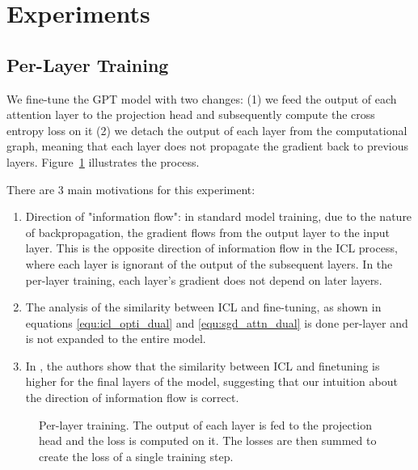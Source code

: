 \documentclass[11pt]{article}
\begin{document}
\section{Experiments}
\subsection{Per-Layer Training}
We fine-tune the GPT model with two changes: (1) we feed the output of each attention layer to the projection head and subsequently compute the cross entropy loss on it
(2) we detach the output of each layer from the computational graph, meaning that each layer does not propagate the gradient back to previous layers. Figure~\ref{per-layer-training} illustrates the process.

There are 3 main motivations for this experiment:
\begin{enumerate}
	\item Direction of "information flow": in standard model training, due to the nature of backpropagation, the gradient flows from the output layer to the input layer.
	      This is the opposite direction of information flow in the ICL process, where each layer is ignorant of the output of the subsequent layers.
	      In the per-layer training, each layer's gradient does not depend on later layers.
	\item The analysis of the similarity between ICL and fine-tuning, as shown in equations \ref{equ:icl_opti_dual} and \ref{equ:sgd_attn_dual} is done per-layer and is not expanded to the entire model.
	\item In \cite{dai2023gpt}, the authors show that the similarity between ICL and finetuning is higher for the final layers of the model, suggesting that our intuition about the direction of information flow is correct.
\end{enumerate}

\begin{figure}%
	\centering
	\caption{Per-layer training. The output of each layer is fed to the projection head and the loss is computed on it. The losses are then summed to create the loss of a single training step.}
	\label{per-layer-training}
\end{figure}
\end{document}
